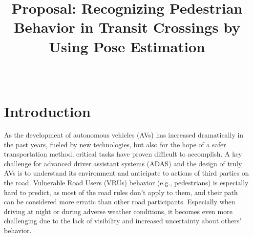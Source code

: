 \documentclass[journal,letterpaper]{IEEEtran}
\begin{document}

\title{Proposal: Recognizing Pedestrian Behavior in Transit Crossings by Using Pose Estimation}

\author{%
  \\
}


\maketitle

%
%

\section{Introduction}\label{sec:introduction}

As the development of autonomous vehicles (AVs) has increased dramatically in the past years, fueled by new technologies, but also for the hope of a safer transportation method, critical tasks have proven difficult to accomplish. A key challenge for advanced driver assistant systems (ADAS) and the design of truly AVs is to understand its environment and anticipate to actions of third parties on the road. Vulnerable Road Users (VRUs) behavior (e.g., pedestrians) is especially hard to predict, as most of the road rules don't apply to them, and their path can be considered more erratic than other road participants. Especially when driving at night or during adverse weather conditions, it becomes even more challenging due to the lack of visibility and increased uncertainty about others' behavior. 

\end{document}
